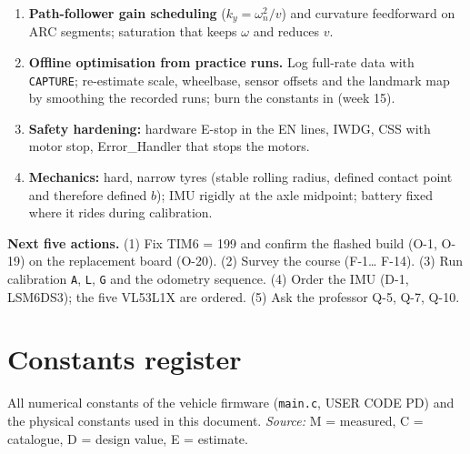 \documentclass[11pt,a4paper]{article}
\newcommand{\code}[1]{\texttt{\small #1}}
\begin{document}
\begin{enumerate}[leftmargin=7mm]
stretches, and a landmark fix within a few metres of each waypoint (\cref{fig:budget}).
\item \textbf{Path-follower gain scheduling} ($k_y=\omega_n^2/v$) and curvature
feedforward on ARC segments; saturation that keeps $\omega$ and reduces $v$.
\item \textbf{Offline optimisation from practice runs.} Log full-rate data with
\code{CAPTURE}; re-estimate scale, wheelbase, sensor offsets and the landmark map
by smoothing the recorded runs; burn the constants in (week 15).
\item \textbf{Safety hardening:} hardware E-stop in the EN lines, IWDG, CSS with
motor stop, Error\_Handler that stops the motors.
\item \textbf{Mechanics:} hard, narrow tyres (stable rolling radius, defined
contact point and therefore defined $b$); IMU rigidly at the axle midpoint;
battery fixed where it rides during calibration.
\end{enumerate}

\begin{keybox}
\textbf{Next five actions.} (1) Fix TIM6 = 199 and confirm the flashed build
(O-1, O-19) on the replacement board (O-20). (2) Survey the course (F-1\ldots
F-14). (3) Run calibration \code{A}, \code{L}, \code{G} and the odometry sequence.
(4) Order the IMU (D-1, LSM6DS3); the five VL53L1X are ordered. (5) Ask the professor Q-5, Q-7, Q-10.
\end{keybox}
\clearpage
\appendix
\section{Constants register}\label{app:constants}

All numerical constants of the vehicle firmware (\code{main.c}, USER CODE PD) and
the physical constants used in this document. \emph{Source:} M = measured,
C = catalogue, D = design value, E = estimate.
\end{document}
